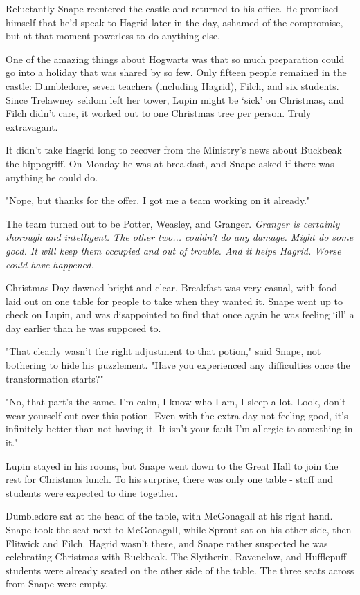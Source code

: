 Reluctantly Snape reentered the castle and returned to his office. He promised himself that he'd speak to Hagrid later in the day, ashamed of the compromise, but at that moment powerless to do anything else.

One of the amazing things about Hogwarts was that so much preparation could go into a holiday that was shared by so few. Only fifteen people remained in the castle: Dumbledore, seven teachers (including Hagrid), Filch, and six students. Since Trelawney seldom left her tower, Lupin might be `sick' on Christmas, and Filch didn't care, it worked out to one Christmas tree per person. Truly extravagant.

It didn't take Hagrid long to recover from the Ministry's news about Buckbeak the hippogriff. On Monday he was at breakfast, and Snape asked if there was anything he could do.

"Nope, but thanks for the offer. I got me a team working on it already."

The team turned out to be Potter, Weasley, and Granger. \emph{Granger is certainly thorough and intelligent. The other two... couldn't do any damage. Might do some good. It will keep them occupied and out of trouble. And it helps Hagrid. Worse could have happened.}

Christmas Day dawned bright and clear. Breakfast was very casual, with food laid out on one table for people to take when they wanted it. Snape went up to check on Lupin, and was disappointed to find that once again he was feeling `ill' a day earlier than he was supposed to.

"That clearly wasn't the right adjustment to that potion," said Snape, not bothering to hide his puzzlement. "Have you experienced any difficulties once the transformation starts?"

"No, that part's the same. I'm calm, I know who I am, I sleep a lot. Look, don't wear yourself out over this potion. Even with the extra day not feeling good, it's infinitely better than not having it. It isn't your fault I'm allergic to something in it."

Lupin stayed in his rooms, but Snape went down to the Great Hall to join the rest for Christmas lunch. To his surprise, there was only one table - staff and students were expected to dine together.

Dumbledore sat at the head of the table, with McGonagall at his right hand. Snape took the seat next to McGonagall, while Sprout sat on his other side, then Flitwick and Filch. Hagrid wasn't there, and Snape rather suspected he was celebrating Christmas with Buckbeak. The Slytherin, Ravenclaw, and Hufflepuff students were already seated on the other side of the table. The three seats across from Snape were empty.

